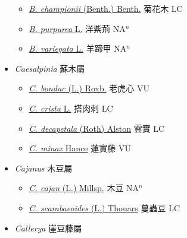 \begin{itemize}
  \begin{itemize}
        \item[] \href{http://www.theplantlist.org/tpl1.1/search?q=Bauhinia+championii}{\textit{B. championii} (Benth.) Benth.}   菊花木 LC
        \item[] \href{http://www.theplantlist.org/tpl1.1/search?q=Bauhinia+purpurea}{\textit{B. purpurea} L.}   洋紫荊 NA$^n$
        \item[] \href{http://www.theplantlist.org/tpl1.1/search?q=Bauhinia+variegata}{\textit{B. variegata} L.}   羊蹄甲 NA$^n$
  \end{itemize}
 \item[] \textit{Caesalpinia} 蘇木屬
                    
  \begin{itemize}
        \item[] \href{http://www.theplantlist.org/tpl1.1/search?q=Caesalpinia+bonduc}{\textit{C. bonduc} (L.) Roxb.}   老虎心 VU
        \item[] \href{http://www.theplantlist.org/tpl1.1/search?q=Caesalpinia+crista}{\textit{C. crista} L.}   搭肉刺 LC
        \item[] \href{http://www.theplantlist.org/tpl1.1/search?q=Caesalpinia+decapetala}{\textit{C. decapetala} (Roth) Alston}   雲實 LC
        \item[] \href{http://www.theplantlist.org/tpl1.1/search?q=Caesalpinia+minax}{\textit{C. minax} Hance}   蓮實藤 VU
  \end{itemize}
 \item[] \textit{Cajanus} 木豆屬
                    
  \begin{itemize}
        \item[] \href{http://www.theplantlist.org/tpl1.1/search?q=Cajanus+cajan}{\textit{C. cajan} (L.) Millsp.}   木豆 NA$^n$
        \item[] \href{http://www.theplantlist.org/tpl1.1/search?q=Cajanus+scarabaeoides}{\textit{C. scarabaeoides} (L.) Thouars}   蔓蟲豆 LC
  \end{itemize}
 \item[] \textit{Callerya} 崖豆藤屬
                    

\end{itemize}
